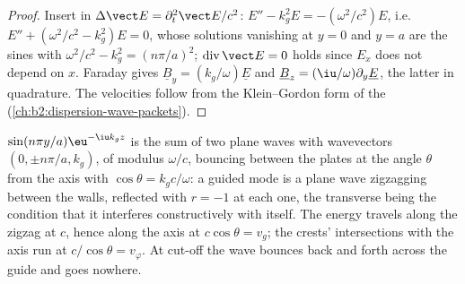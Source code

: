 \begin{proof}
Insert in $\Delta\vect E = \partial_t^2\vect E/c^2$: $E'' - k_g^2E = -(\omega^2/c^2)E$, i.e.\
$E'' + (\omega^2/c^2 - k_g^2)E = 0$, whose solutions vanishing at $y = 0$ and
$y = a$ are the sines with $\omega^2/c^2 - k_g^2 = (n\pi/a)^2$; $\operatorname{div}
\vect E = 0$ holds since $E_x$ does not depend on $x$. Faraday gives
$\underline B_y = (k_g/\omega)\underline E$ and $\underline B_z = (\iu/\omega)\partial_y\underline E$, the latter
in quadrature. The velocities follow from the Klein--Gordon form of
the  (\cref{ch:b2:dispersion-wave-packets}).
\end{proof}

\begin{remark}[The mode as two plane waves]\label{rem:b2:guided-waves:zigzag}
$\sin(n\pi y/a)\eu^{-\iu k_gz}$ is the sum of two plane waves with
wavevectors $(0, \pm n\pi/a, k_g)$, of modulus $\omega/c$, bouncing between
the plates at the angle $\theta$ from the axis with $\cos\theta = k_gc/\omega$:
a guided mode is a plane wave zigzagging between the walls, reflected
with $r = -1$ at each one, the transverse  being the
condition that it interferes constructively with itself. The energy
travels along the zigzag at $c$, hence along the axis at $c\cos\theta = v_g$;
the crests' intersections with the axis run at $c/\cos\theta = v_\varphi$. At
cut-off the wave bounces back and forth across the guide and goes
nowhere.
\end{remark}


